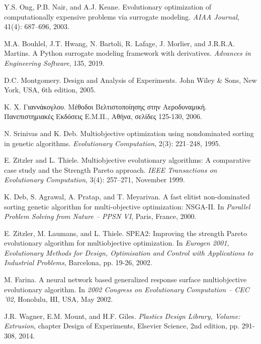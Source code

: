 \documentclass[twoside, 12pt,notitlepage]{report}
\begin{document}
\begin{thebibliography}{9}

Y.S. Ong, P.B. Nair, and A.J. Keane. Evolutionary 
optimization of computationally expensive problems via 
surrogate modeling. \textit{AIAA Journal}, 
41(4): 687–696, 2003.

M.A. Bouhlel, J.T. Hwang, N. Bartoli, R. Lafage, 
J. Morlier, and J.R.R.A. Martins. A Python surrogate 
modeling framework with derivatives. \textit{Advances 
in Engineering Software}, 135, 2019.

D.C. Montgomery. Design and Analysis of Experiments. John 
Wiley \& Sons, New York, USA, 6th edition, 2005.

 Κ. Χ. Γιαννάκογλου. Μέθοδοι Βελτιστοποίησης 
στην Αεροδυναμική. Πανεπιστημιακές Εκδόσεις Ε.Μ.Π., 
Αθήνα, σελίδες 125-130, 2006.

N. Srinivas and K. Deb. Multiobjective optimization using 
nondominated sorting in genetic algorithms. 
\textit{Evolutionary Computation}, 2(3): 221–248, 1995.

E. Zitzler and L. Thiele. Multiobjective evolutionary 
algorithms: A comparative case study and the Strength 
Pareto approach. \textit{IEEE Transactions on Evolutionary
Computation}, 3(4): 257–271, November 1999.

K. Deb, S. Agrawal, A. Pratap, and T. Meyarivan. A fast 
elitist non-dominated sorting genetic algorithm for 
multi-objective optimization: NSGA-II. In
\textit{Parallel Problem Solving from Nature – PPSN 
VI}, Paris, France, 2000. 

E. Zitzler, M. Laumans, and L. Thiele. SPEA2: Improving 
the strength Pareto evolutionary algorithm for 
multiobjective optimization. In \textit{Eurogen 2001, 
Evolutionary Methods for Design, Optimisation and Control 
with Applications to Industrial Problems}, Barcelona, 
pp. 19-26, 2002.

M. Farina. A neural network based generalized response 
surface multiobjective evolutionary algorithm. In 
\textit{2002 Congress on Evolutionary Computation – CEC 
’02}, Honolulu, HI, USA, May 2002.

J.R. Wagner, E.M. Mount, and H.F. Giles. \textit{Plastics 
Design Library, Volume: Extrusion}, chapter Design of 
Experiments, Elsevier Science, 2nd edition, pp. 291-308, 
2014.


\end{thebibliography}
\end{document}
